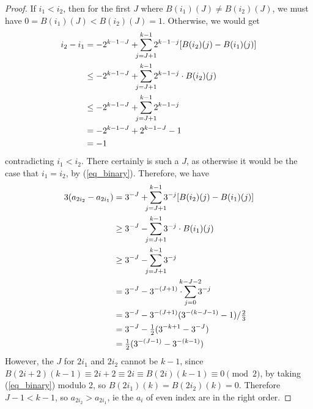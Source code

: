 \documentclass[fleqn,a4paper,11pt]{article}
\begin{document}
\begin{proof}
  If \(i_1 < i_2\), then for the first \(J\) where \(B(i_1)(J) \ne B(i_2)(J)\),
  we must have \(0 = B(i_1)(J) < B(i_2)(J) = 1\). Otherwise, we would get
  \begin{align*}
   i_2 - i_1
    &= -2^{k - 1 - J} +
        \sum_{\mathclap{j = J + 1}}^{k - 1}
         2^{k - 1 - j}[B(i_2)(j) - B(i_1)(j)] \\
    &\le -2^{k - 1 - J} +
        \sum_{\mathclap{j = J + 1}}^{k - 1}
         2^{k - 1 - j} \cdot B(i_2)(j) \\
    &\le -2^{k - 1 - J} + \sum_{\mathclap{j = J + 1}}^{k - 1} 2^{k - 1 - j} \\
    &= -2^{k - 1 - J} + 2^{k - 1 - J} - 1 \\
    &= -1
  \end{align*}
  contradicting \(i_1 < i_2\). There certainly is such a \(J\), as otherwise it
  would be the case that \(i_1 = i_2\), by (\ref{eq_binary}). Therefore, we have
  \begin{align*}
   3(a_{2i_2} - a_{2i_1})
    &= 3^{-J} +
        \sum_{\mathclap{j = J + 1}}^{k - 1} 3^{-j}[B(i_2)(j) - B(i_1)(j)] \\
    &\ge 3^{-J} - \sum_{\mathclap{j = J + 1}}^{k - 1} 3^{-j} \cdot B(i_1)(j) \\
    &\ge 3^{-J} - \sum_{\mathclap{j = J + 1}}^{k - 1} 3^{-j} \\
    &= 3^{-J} - 3^{-(J + 1)} \cdot
        \sum_{\mathclap{j = 0}}^{\mathclap{k - J - 2}} 3^{-j} \\
    &= 3^{-J} - 3^{-(J + 1)}(3^{-(k - J - 1)} - 1) / \tfrac 23 \\
    &= 3^{-J} - \tfrac 12 (3^{-k + 1} - 3^{-J}) \\
    &= \tfrac 12 (3^{-(J - 1)} - 3^{-(k - 1)})
  \end{align*}
  However, the \(J\) for \(2i_1\) and \(2i_2\) cannot be \(k - 1\), since
  \(B(2i + 2)(k - 1)
    \equiv 2i + 2 \equiv 2i \equiv B(2i)(k - 1) \equiv 0 \pmod 2\),
  by taking (\ref{eq_binary}) modulo 2, so \(B(2i_1)(k) = B(2i_2)(k) = 0\).
  Therefore \(J - 1  < k - 1\), so \(a_{2i_2} > a_{2i_1}\), ie the \(a_i\) of
  even index are in the right order.


\end{proof}
\end{document}
